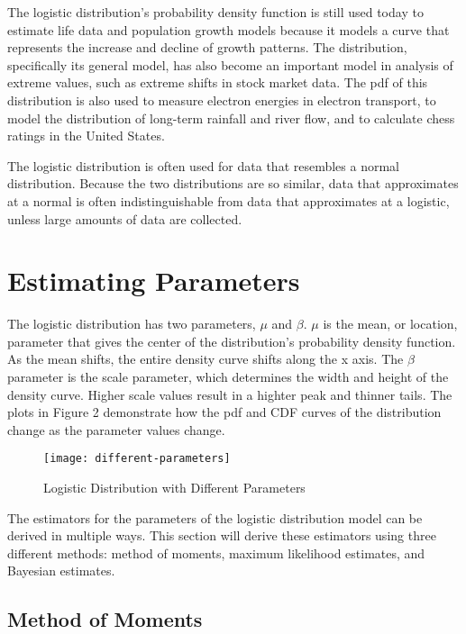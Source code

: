 \documentclass{svproc}
\begin{document}
The logistic distribution's probability density function is still used today to estimate life data and population growth models because it models a curve that represents the increase and decline of growth patterns. The distribution, specifically its general model, has also become an important model in analysis of extreme values, such as extreme shifts in stock market data. The pdf of this distribution is also used to measure electron energies in electron transport, to model the distribution of long-term rainfall and river flow, and to calculate chess ratings in the United States.  

The logistic distribution is often used for data that resembles a normal distribution. Because the two distributions are so similar, data that approximates at a normal is often indistinguishable from data that approximates at a logistic, unless large amounts of data are collected.

\section{Estimating Parameters}

The logistic distribution has two parameters, $\mu$ and $\beta$. $\mu$ is the mean, or location, parameter that gives the center of the distribution's probability density function. As the mean shifts, the entire density curve shifts along the x axis. The $\beta$ parameter is the scale parameter, which determines the width and height of the density curve. Higher scale values result in a highter peak and thinner tails. The plots in Figure 2 demonstrate how the pdf and CDF curves of the distribution change as the parameter values change.

\begin{figure}[H]
\begin{center}
\caption{Logistic Distribution with Different Parameters}
\texttt{[image: different-parameters]}
\label{plot2}
\end{center}
\end{figure}

The estimators for the parameters of the logistic distribution model can be derived in multiple ways. This section will derive these estimators using three different methods: method of moments, maximum likelihood estimates, and Bayesian estimates. 

\subsection{Method of Moments}
\end{document}
